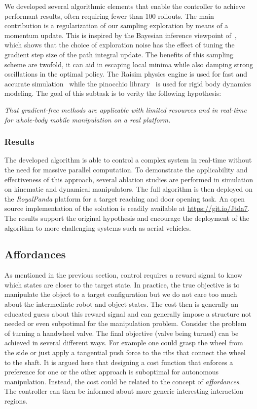 We developed several algorithmic elements that enable the controller to achieve performant results, often requiring fewer than 100 rollouts. The main contribution is a regularization of our sampling exploration by means of a momentum update. This is inspired by the Bayesian inference viewpoint of~\cite{lambert_stein_2020}, which shows that the choice of exploration noise has the effect of tuning the gradient step size of the path integral update. The benefits of this sampling scheme are twofold, it can aid in escaping local minima while also damping strong oscillations in the optimal policy. The Raisim physics engine is used for fast and accurate simulation~\cite{raisim} while the pinocchio library~\cite{pinocchioweb} is used for rigid body dynamics modeling. The goal of this subtask is to verity the following hypothesis:
\begin{displayquote}
\textit{That gradient-free methods are applicable with limited resources and in real-time for whole-body mobile manipulation on a real platform.}
\end{displayquote}

\subsubsection{Results}
The developed algorithm is able to control a complex system in real-time without the need for massive parallel computation. To demonstrate the applicability and effectiveness of this approach, several ablation studies are performed in simulation on kinematic and dynamical manipulators. The full algorithm is then deployed on the \textit{RoyalPanda} platform for a target reaching and door opening task. An open source implementation of the solution is readily available at \url{https://git.io/Jtda7}. The results support the original hypothesis and encourage the deployment of the algorithm to more challenging systems such as aerial vehicles.

\subsection{Affordances}
As mentioned in the previous section, control requires a reward signal to know which states are closer to the target state. In practice, the true objective is to manipulate the object to a target configuration but we do not care too much about the intermediate robot and object states. The cost then is generally an educated guess about this reward signal and can generally impose a structure not needed or even subpotimal for the manipulation problem. Consider the problem of turning a handwheel valve. The final objective (valve being turned) can be achieved in several different ways. For example one could grasp the wheel from the side or just apply a tangential push force to the ribs that connect the wheel to the shaft. It is argued here that designing a cost function that enforces a preference for one or the other approach is suboptimal for autonomous manipulation. Instead, the cost could be related to the concept of \emph{affordances}. The controller can then be informed about more generic interesting interaction regions.

